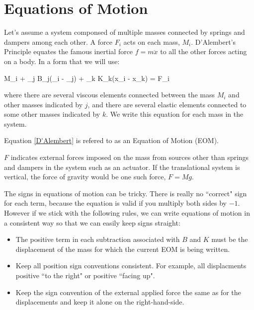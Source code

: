 \section{Equations of Motion}

Let's assume a system componsed of multiple masses connected by springs and dampers among each other.   A force $F_i$ acts on each mass, $M_i$.   D'Alembert's Principle equates the famous inertial force $f=m\ddot{x}$ to all the other forces acting on a body.   In a form that we will use:

\bq\label{D'Alembert}
M_i  + \sum_j B_j(_i - _j) + \sum_k K_k(x_i - x_k) = F_i
\eq

where there are several viscous elements connected between the mass $M_i$ and other masses indicated by $j$, and there are several elastic elements connected to some other masses indicated by $k$.  We write this equation for each mass in the system.

Equation \ref{D'Alembert} is refered to as an Equation of Motion (EOM).

$F$ indicates external forces imposed on the mass from sources other than springs and dampers in the system such as an actuator.  If the translational system is vertical, the force of gravity would be one such force, $F=Mg$.

The signs in equations of motion can be tricky.   There is really no ``correct" sign for each term, because the equation is valid if you multiply both sides by $-1$.   However if we stick with the following rules, we can write equations of motion in a consistent way so that we can easily keep signs straight:

\begin{itemize}

  \item The positive term in each subtraction associated with $B$ and $K$ must be the displacement of the mass for which the current EOM is being written.
  \item Keep all position sign conventions consistent.  For example, all displacments positive ``to the right" or positive ``facing up".
  \item Keep the sign convention of the external applied force the same as for the displacements and keep it alone on the right-hand-side.

\end{itemize}







